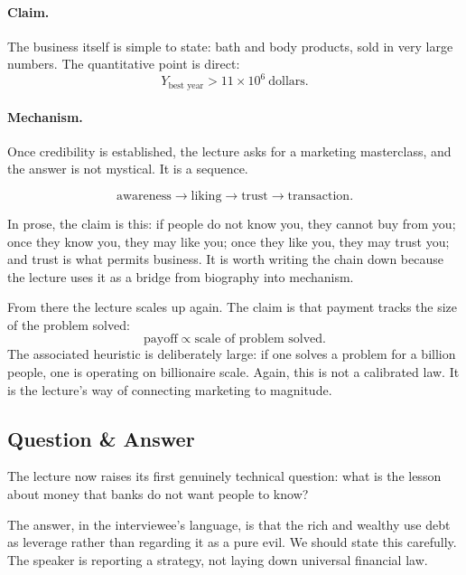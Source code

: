 \paragraph{Claim.}
The business itself is simple to state: bath and body products, sold in very large numbers. The quantitative point is direct:
\begin{equation}
Y_{\text{best year}} > 11\times 10^{6}\ \text{dollars}.
\end{equation}

\paragraph{Mechanism.}
Once credibility is established, the lecture asks for a marketing masterclass, and the answer is not mystical. It is a sequence.

\begin{equation}
\text{awareness} \to \text{liking} \to \text{trust} \to \text{transaction}.
\end{equation}

In prose, the claim is this: if people do not know you, they cannot buy from you; once they know you, they may like you; once they like you, they may trust you; and trust is what permits business. It is worth writing the chain down because the lecture uses it as a bridge from biography into mechanism.

From there the lecture scales up again. The claim is that payment tracks the size of the problem solved:
\begin{equation}
\text{payoff} \propto \text{scale of problem solved}.
\end{equation}
The associated heuristic is deliberately large: if one solves a problem for a billion people, one is operating on billionaire scale. Again, this is not a calibrated law. It is the lecture's way of connecting marketing to magnitude.

\subsection{Question \& Answer}

The lecture now raises its first genuinely technical question: what is the lesson about money that banks do not want people to know?

The answer, in the interviewee's language, is that the rich and wealthy use debt as leverage rather than regarding it as a pure evil. We should state this carefully. The speaker is reporting a strategy, not laying down universal financial law.

